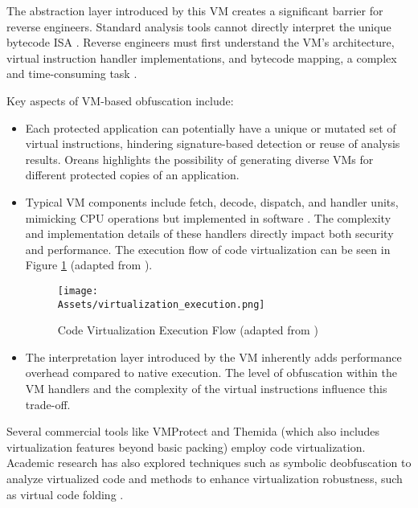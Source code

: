 The abstraction layer introduced by this VM creates a significant barrier for reverse engineers. Standard analysis tools cannot directly interpret the unique bytecode ISA \cite{Salwan2018SymbolicDeobfuscation}. Reverse engineers must first understand the VM's architecture, virtual instruction handler implementations, and bytecode mapping, a complex and time-consuming task \cite{Don20, Hac24}.

Key aspects of VM-based obfuscation include:
\begin{itemize}
    \item {} Each protected application can potentially have a unique or mutated set of virtual instructions, hindering signature-based detection or reuse of analysis results. Oreans \cite{Ore06} highlights the possibility of generating diverse VMs for different protected copies of an application.
    \item {} Typical VM components include fetch, decode, dispatch, and handler units, mimicking CPU operations but implemented in software \cite{Salwan2018SymbolicDeobfuscation, Hac24}. The complexity and implementation details of these handlers directly impact both security and performance. The execution flow of code virtualization can be seen in Figure \ref{fig:jurnal_ui_ana_execution_virtualization_en} (adapted from \cite{Don20}).

    \begin{figure}[H]
        \centering
        \texttt{[image: \\Assets/virtualization\_execution.png]}
        \caption{Code Virtualization Execution Flow (adapted from \cite{Don20})}
        \label{fig:jurnal_ui_ana_execution_virtualization_en}
    \end{figure}

    \item {} The interpretation layer introduced by the VM inherently adds performance overhead compared to native execution. The level of obfuscation within the VM handlers and the complexity of the virtual instructions influence this trade-off.
\end{itemize}

Several commercial tools like VMProtect \cite{VMP24} and Themida \cite{Ore24} (which also includes virtualization features beyond basic packing) employ code virtualization. Academic research has also explored techniques such as symbolic deobfuscation to analyze virtualized code \cite{Salwan2018SymbolicDeobfuscation} and methods to enhance virtualization robustness, such as virtual code folding \cite{Don20}.

